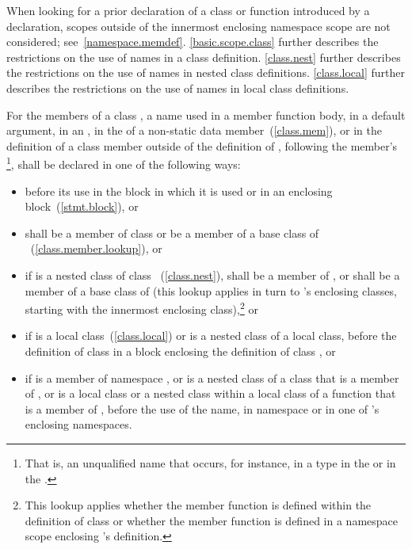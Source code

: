 \exitexample \enternote When looking for a prior declaration of a class
or function introduced by a  declaration, scopes outside
of the innermost enclosing namespace scope are not considered;
see~\ref{namespace.memdef}. \exitnote \enternote \ref{basic.scope.class}
further describes the restrictions on the use of names in a class
definition. \ref{class.nest} further describes the restrictions on the
use of names in nested class definitions. \ref{class.local} further
describes the restrictions on the use of names in local class
definitions. \exitnote

\pnum
For the members of a class , a name used in a member function
body, in a default argument, in an , in the
 of a non-static data
member~(\ref{class.mem}), or in the definition of a class member
outside of the definition of , following the
member's
\footnote{That is, an unqualified name that occurs,
for instance, in a
type in the
 or in the
.}, shall be declared in one of the
following ways:

\begin{itemize}
\item before its use in the block in which it is used or in an enclosing
block~(\ref{stmt.block}), or

\item shall be a member of class  or be a member of a base
class of ~(\ref{class.member.lookup}), or

\item if 
is a nested class of class ~(\ref{class.nest}), shall be a
member of , or shall be a member of a base class of 
(this lookup applies in turn to 's enclosing classes, starting
with the innermost enclosing class),\footnote{This lookup applies whether
the member function is defined
within the definition of class  or whether the member function
is defined in a namespace scope enclosing 's definition.}
or

\item if  is a local class~(\ref{class.local}) or is a nested
class of a local class, before the definition of class  in a
block enclosing the definition of class , or

\item if  is a member of namespace , or is a nested
class of a class that is a member of , or is a local class or a
nested class within a local class of a function that is a member of
, before the use of the name, in namespace 
or in one of  's enclosing namespaces.
\end{itemize}


